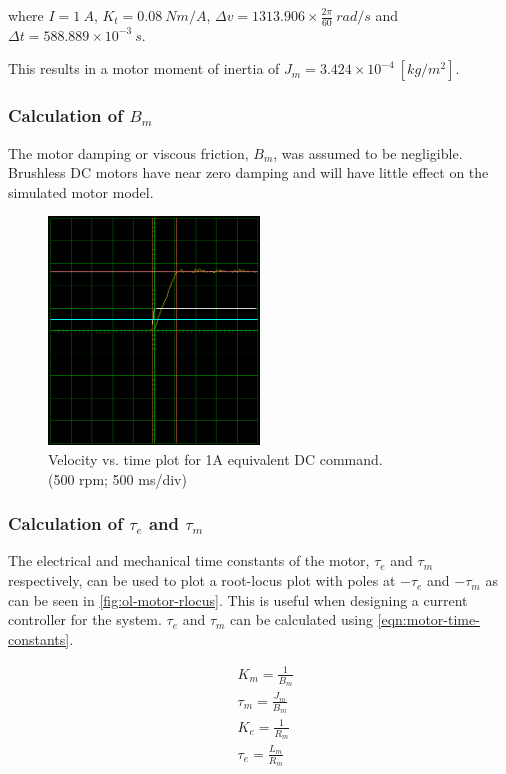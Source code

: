 where $I=1\ A$, $K_t=0.08\ Nm/A$, $\Delta v = 1313.906\times \frac{2\pi}{60}\ rad/s$ and $\Delta t = 588.889\times10^{-3}\ s$.

This results in a motor moment of inertia of $J_m = 3.424 \times 10^{-4}\ [kg/m^2]$.

\subsubsection{Calculation of $B_m$}

The motor damping or viscous friction, $B_m$, was assumed to be negligible. Brushless DC motors have near zero damping and will have little effect on the simulated motor model.

\begin{figure}
\centering
\includegraphics[width=0.5\textwidth]{images/driveware/current-velocity-response} 
\caption{Velocity vs. time plot for 1A equivalent DC command.\\
(500 rpm; 500 ms/div)}
\label{fig:jm-plots}
\end{figure}

\subsubsection{Calculation of $\tau_e$ and $\tau_m$}
The electrical and mechanical time constants of the motor, $\tau_e$ and $\tau_m$ respectively, can be used to plot a root-locus plot with poles at $-\tau_e$ and $-\tau_m$ as can be seen in \cref{fig:ol-motor-rlocus}. This is useful when designing a current controller for the system. $\tau_e$ and $\tau_m$ can be calculated using \cref{eqn:motor-time-constants}.

\begin{equation} \label{eqn:motor-time-constants}
\begin{aligned}
&K_m = \frac{1}{B_m} \\
&\tau_m = \frac{J_m}{B_m} \\
&K_e = \frac{1}{R_m} \\
&\tau_e = \frac{L_m}{R_m} 
\end{aligned}
\end{equation}

